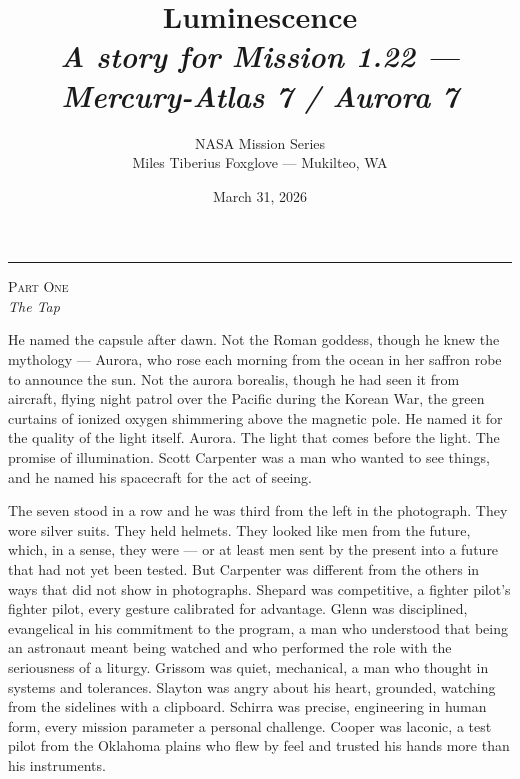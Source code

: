 \documentclass[12pt, letterpaper]{article}
\title{\Huge\textbf{Luminescence}\\[0.5em]\large\textit{A story for Mission 1.22 --- Mercury-Atlas 7 / Aurora 7}}
\author{NASA Mission Series\\[0.3em]\small Miles Tiberius Foxglove --- Mukilteo, WA}
\date{March 31, 2026}
\begin{document}
\maketitle
\thispagestyle{empty}

\vspace{1em}
\noindent\rule{\textwidth}{0.4pt}
\vspace{1em}

\begin{center}
{\small\textsc{Part One}}\\[0.3em]
{\large\textit{The Tap}}
\end{center}

\vspace{1em}

\noindent He named the capsule after dawn. Not the Roman goddess, though he knew the mythology --- Aurora, who rose each morning from the ocean in her saffron robe to announce the sun. Not the aurora borealis, though he had seen it from aircraft, flying night patrol over the Pacific during the Korean War, the green curtains of ionized oxygen shimmering above the magnetic pole. He named it for the quality of the light itself. Aurora. The light that comes before the light. The promise of illumination. Scott Carpenter was a man who wanted to see things, and he named his spacecraft for the act of seeing.

The seven stood in a row and he was third from the left in the photograph. They wore silver suits. They held helmets. They looked like men from the future, which, in a sense, they were --- or at least men sent by the present into a future that had not yet been tested. But Carpenter was different from the others in ways that did not show in photographs. Shepard was competitive, a fighter pilot's fighter pilot, every gesture calibrated for advantage. Glenn was disciplined, evangelical in his commitment to the program, a man who understood that being an astronaut meant being watched and who performed the role with the seriousness of a liturgy. Grissom was quiet, mechanical, a man who thought in systems and tolerances. Slayton was angry about his heart, grounded, watching from the sidelines with a clipboard. Schirra was precise, engineering in human form, every mission parameter a personal challenge. Cooper was laconic, a test pilot from the Oklahoma plains who flew by feel and trusted his hands more than his instruments.
\end{document}
